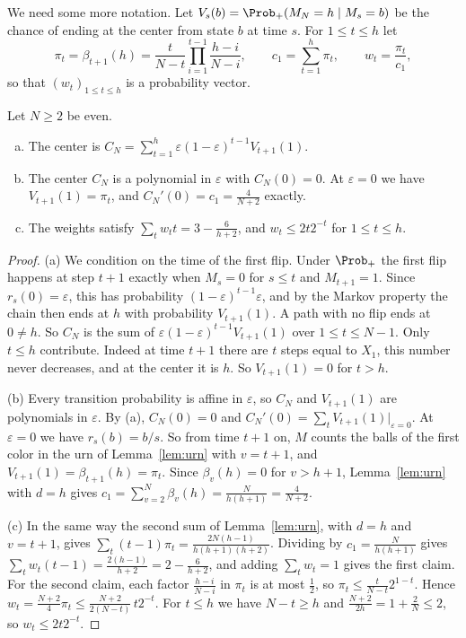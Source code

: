 We need some more notation. Let $V_s(b)=\Prob_+(M_N=h\mid M_s=b)$ be the
chance of ending at the center from state $b$ at time $s$. For $1\le t\le h$
let
\[
 \pi_t=\beta_{t+1}(h)=\frac t{N-t}\prod_{i=1}^{t-1}\frac{h-i}{N-i},\qquad
 c_1=\sum_{t=1}^h\pi_t,\qquad w_t=\frac{\pi_t}{c_1},
\]
so that $(w_t)_{1\le t\le h}$ is a probability vector.

\begin{proposition}\label{prop:first-mutation}
Let $N\ge2$ be even.
\begin{enumerate}[(a)]
\item The center is
$C_N=\sum_{t=1}^h\varepsilon(1-\varepsilon)^{t-1}V_{t+1}(1)$.
\item The center $C_N$ is a polynomial in $\varepsilon$ with $C_N(0)=0$. At
$\varepsilon=0$ we have $V_{t+1}(1)=\pi_t$, and
$C_N'(0)=c_1=\frac4{N+2}$ exactly.
\item The weights satisfy $\sum_tw_tt=3-\frac6{h+2}$, and $w_t\le2t2^{-t}$
for $1\le t\le h$.
\end{enumerate}
\end{proposition}

\begin{proof}
(a) We condition on the time of the first flip. Under $\Prob_+$ the first
flip happens at step $t+1$ exactly when $M_s=0$ for $s\le t$ and $M_{t+1}=1$.
Since $r_s(0)=\varepsilon$, this has probability
$(1-\varepsilon)^{t-1}\varepsilon$, and by the Markov property the chain then
ends at $h$ with probability $V_{t+1}(1)$. A path with no flip ends at
$0\ne h$. So $C_N$ is the sum of $\varepsilon(1-\varepsilon)^{t-1}V_{t+1}(1)$
over $1\le t\le N-1$. Only $t\le h$ contribute. Indeed at time $t+1$ there
are $t$ steps equal to $X_1$, this number never decreases, and at the center
it is $h$. So $V_{t+1}(1)=0$ for $t>h$.

(b) Every transition probability is affine in $\varepsilon$, so $C_N$ and
$V_{t+1}(1)$ are polynomials in $\varepsilon$. By (a), $C_N(0)=0$ and
$C_N'(0)=\sum_tV_{t+1}(1)|_{\varepsilon=0}$. At $\varepsilon=0$ we have
$r_s(b)=b/s$. So from time $t+1$ on, $M$ counts the balls of the first
color in the urn of Lemma~\ref{lem:urn} with $v=t+1$, and
$V_{t+1}(1)=\beta_{t+1}(h)=\pi_t$. Since $\beta_v(h)=0$ for $v>h+1$,
Lemma~\ref{lem:urn} with $d=h$ gives
$c_1=\sum_{v=2}^N\beta_v(h)=\frac N{h(h+1)}=\frac4{N+2}$.

(c) In the same way the second sum of Lemma~\ref{lem:urn}, with $d=h$ and
$v=t+1$, gives $\sum_t(t-1)\pi_t=\frac{2N(h-1)}{h(h+1)(h+2)}$. Dividing by
$c_1=\frac N{h(h+1)}$ gives $\sum_tw_t(t-1)=\frac{2(h-1)}{h+2}=2-\frac6{h+2}$,
and adding $\sum_tw_t=1$ gives the first claim. For the second claim, each
factor $\frac{h-i}{N-i}$ in $\pi_t$ is at most $\frac12$, so
$\pi_t\le\frac t{N-t}2^{1-t}$. Hence
$w_t=\frac{N+2}4\pi_t\le\frac{N+2}{2(N-t)}\,t2^{-t}$. For $t\le h$ we have
$N-t\ge h$ and $\frac{N+2}{2h}=1+\frac2N\le2$, so $w_t\le2t2^{-t}$.
\end{proof}


